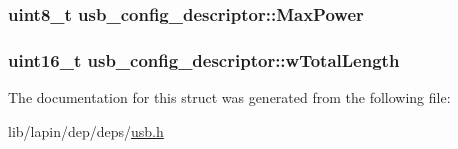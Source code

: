\hypertarget{structusb__config__descriptor_a3ff6bd15942a15e5a316ef57445856dd}{
\subsubsection[{Max\-Power}]{\setlength{\rightskip}{0pt plus 5cm}uint8\-\_\-t usb\-\_\-config\-\_\-descriptor\-::\-Max\-Power}}\label{structusb__config__descriptor_a3ff6bd15942a15e5a316ef57445856dd}
\hypertarget{structusb__config__descriptor_a09fb7940f26366f7f0aedb496a18b97c}{
\subsubsection[{w\-Total\-Length}]{\setlength{\rightskip}{0pt plus 5cm}uint16\-\_\-t usb\-\_\-config\-\_\-descriptor\-::w\-Total\-Length}}\label{structusb__config__descriptor_a09fb7940f26366f7f0aedb496a18b97c}


The documentation for this struct was generated from the following file\-:\begin{DoxyCompactItemize}
\item 
lib/lapin/dep/deps/\hyperlink{deps_2usb_8h}{usb.\-h}\end{DoxyCompactItemize}
